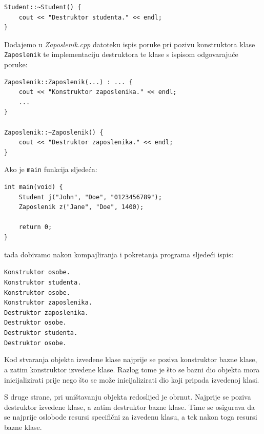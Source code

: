 \begin{rjesenje}
\begin{verbatim}
Student::~Student() {
    cout << "Destruktor studenta." << endl;
}
    \end{verbatim}
    Dodajemo u \textit{Zaposlenik.cpp} datoteku ispis poruke pri pozivu konstruktora klase \texttt{Zaposlenik}
    te implementaciju destruktora te klase s ispisom odgovarajuće poruke:
    \begin{verbatim}
Zaposlenik::Zaposlenik(...) : ... {
    cout << "Konstruktor zaposlenika." << endl;
    ...
}

Zaposlenik::~Zaposlenik() {
    cout << "Destruktor zaposlenika." << endl;
}
    \end{verbatim}
    Ako je \texttt{main} funkcija sljedeća:
\begin{verbatim}
int main(void) {
    Student j("John", "Doe", "0123456789");
    Zaposlenik z("Jane", "Doe", 1400);
    
    return 0;
}
\end{verbatim}
    tada dobivamo nakon kompajliranja i pokretanja programa sljedeći ispis:
    \medskip
    
    \hspace*{2em}\texttt{Konstruktor osobe.\\
    \hspace*{2em}Konstruktor studenta.\\
    \hspace*{2em}Konstruktor osobe.\\
    \hspace*{2em}Konstruktor zaposlenika.\\
    \hspace*{2em}Destruktor zaposlenika.\\
    \hspace*{2em}Destruktor osobe.\\
    \hspace*{2em}Destruktor studenta.\\
    \hspace*{2em}Destruktor osobe.}
    \medskip

    Kod stvaranja objekta izvedene klase najprije se poziva konstruktor bazne klase, a zatim konstruktor izvedene klase. Razlog tome je što se bazni dio objekta mora inicijalizirati prije nego što se može inicijalizirati dio koji pripada izvedenoj klasi.
    \medskip
    
    S druge strane, pri uništavanju objekta redoslijed je obrnut. Najprije se poziva destruktor izvedene klase, a zatim destruktor bazne klase. Time se osigurava da se najprije oslobode resursi specifični za izvedenu klasu, a tek nakon toga resursi bazne klase.
\end{rjesenje}


